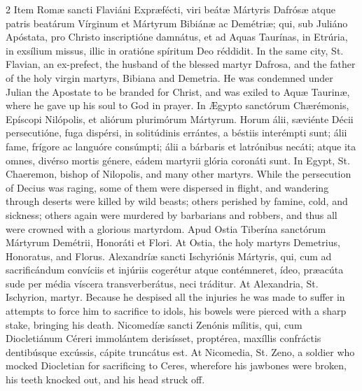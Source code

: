 \begin{paracol}{2}
\switchcolumn*
{}
Item Romæ sancti Flaviáni Expræfécti, viri 
 beátæ Mártyris Dafrósæ atque patris beatárum Vírginum et Mártyrum Bibiánæ ac 
 Demétriæ; qui, sub Juliáno Apóstata, pro Christo inscriptióne damnátus, et 
 ad Aquas Taurínas, in Etrúria, in exsílium missus, illic in oratióne 
 spíritum Deo réddidit.
\switchcolumn
{}
In the same city, St. Flavian, an ex-prefect, the husband of the blessed 
 martyr Dafrosa, and the father of the holy virgin martyrs, Bibiana and 
 Demetria. He was condemned under Julian the Apostate to be branded for 
 Christ, and was exiled to Aquæ Taurinæ, where he gave up his soul to God 
 in prayer.
\switchcolumn*
{}
In Ægypto sanctórum Chærémonis, Epíscopi 
 Nilópolis, et aliórum plurimórum Mártyrum. Horum álii, sæviénte Décii 
 persecutióne, fuga dispérsi, in solitúdinis errántes, a béstiis interémpti 
 sunt; álii fame, frígore ac languóre consúmpti; álii a bárbaris et 
 latrónibus necáti; atque ita omnes, divérso mortis génere, eádem martyrii 
 glória coronáti sunt.
\switchcolumn
{}
In Egypt, St. Chaeremon, bishop of Nilopolis, and many other martyrs. 
 While the persecution of Decius was raging, some of them were dispersed in 
 flight, and wandering through deserts were killed by wild beasts; others 
 perished by famine, cold, and sickness; others again were murdered by 
 barbarians and robbers, and thus all were crowned with a glorious martyrdom.
\switchcolumn*
{}
Apud Ostia Tiberína sanctórum Mártyrum Demétrii, Honoráti et Flori.
\switchcolumn
{}
At Ostia, the holy martyrs Demetrius, Honoratus, and Florus.
\switchcolumn*
{}
Alexandríæ sancti Ischyriónis Mártyris, qui, 
 cum ad sacrificándum convíciis et injúriis cogerétur atque contémneret, ídeo, 
 præacúta sude per média víscera transverberátus, neci tráditur.
\switchcolumn
{}
At Alexandria, St. Ischyrion, martyr. Because he despised all the 
 injuries he was made to suffer in attempts to force him to sacrifice to 
 idols, his bowels were pierced with a sharp stake, bringing his death.
\switchcolumn*
{}
Nicomedíæ sancti Zenónis mílitis, qui, cum 
 Diocletiánum Céreri immolántem derisísset, proptérea, maxíllis confráctis 
 dentibúsque excússis, cápite truncátus est.
\switchcolumn
{}
At Nicomedia, St. Zeno, a soldier who mocked Diocletian for sacrificing to 
 Ceres, wherefore his jawbones were broken, his teeth knocked out, and his 
 head struck off.
\switchcolumn*

\end{paracol}

